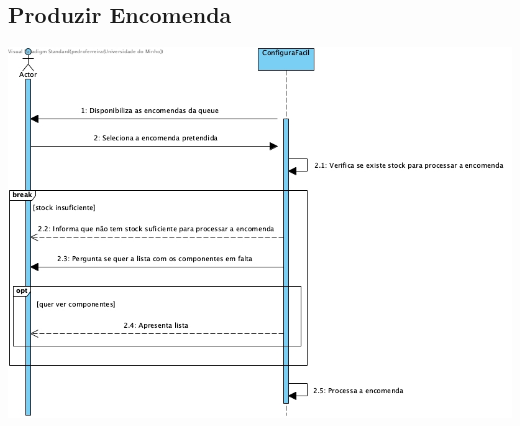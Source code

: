 \subsection{Produzir Encomenda}
\begin{center}
    \centering
 	\includegraphics[scale = 0.6]{DSS/DSS-Produzir_encomenda.jpg}
\end{center}
\newpage